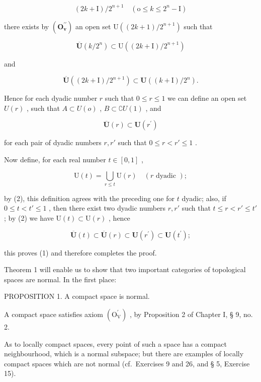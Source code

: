 \[
(2 k + \mathrm{I}) / 2 ^ {n + 1} \quad (\mathrm{o} \leqslant k \leqslant 2 ^ {n} - \mathrm{I})
\]

there exists by \((\mathbf{O}_{\mathbf{v}}^{\prime \prime})\) an open set \(\mathrm{U}((2k + 1) / 2^{n + 1})\) such that

\[
\overline {{{{\mathbf {U}}}}} (k / 2 ^ {n}) \subset \mathrm{U} ((2 k + \mathrm{I}) / 2 ^ {n + 1})
\]

and

\[
\overline {{{\mathbf {U}}}} ((2 k + \mathrm{I}) / 2 ^ {n + 1}) \subset \mathbf {U} ((k + \mathrm{I}) / 2 ^ {n}).
\]

Hence for each dyadic number \(r\) such that \(0 \leqslant r \leqslant 1\) we can define an open set \(U(r)\) , such that \(A \subset U(o)\) , \(B \subset \complement U(1)\) , and

\[
\overline {{{\mathbf {U}}}} (r) \subset \mathbf {U} (r ^ {\prime})\tag{2}
\]

for each pair of dyadic numbers \(r, r'\) such that \(0 \leqslant r < r' \leqslant 1\) .

Now define, for each real number \(t \in [0, 1]\) ,

\[
\mathrm{U} (t) = \bigcup_ {r \leqslant t} \mathrm{U} (r) \quad (r \text { dyadic });
\]

by (2), this definition agrees with the preceding one for \(t\) dyadic; also, if \(0 \leqslant t < t' \leqslant 1\) , then there exist two dyadic numbers \(r, r'\) such that \(t \leqslant r < r' \leqslant t'\) ; by (2) we have \(\mathrm{U}(t) \subset \mathrm{U}(r)\) , hence

\[
\overline {{{\mathbf {U}}}} (t) \subset \overline {{{\mathbf {U}}}} (r) \subset \mathbf {U} (r ^ {\prime}) \subset \mathbf {U} (t ^ {\prime});
\]

this proves (1) and therefore completes the proof.

Theorem 1 will enable us to show that two important categories of topological spaces are normal. In the first place:

PROPOSITION 1. A compact space is normal.

A compact space satisfies axiom \((\mathrm{O}_{\mathrm{V}}^{\prime})\) , by Proposition 2 of Chapter I, § 9, no. 2.

As to locally compact spaces, every point of such a space has a compact neighbourhood, which is a normal subspace; but there are examples of locally compact spaces which are not normal (cf.~Exercises 9 and 26, and § 5, Exercise 15).

